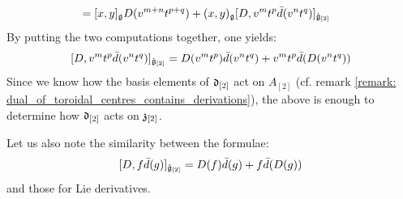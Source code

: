 \begin{remark}
\begin{enumerate}
$$\begin{aligned}
                            & = [x, y]_{\mathfrak{g}} D(v^{m + n} t^{p + q}) + (x, y)_{\mathfrak{g}} [D, v^m t^p \bar{d}(v^n t^q)]_{\hat{\mathfrak{g}}_{[2]}}
                        \end{aligned}
                    $$
                By putting the two computations together, one yields:
                    $$[D, v^m t^p \bar{d}(v^n t^q)]_{\hat{\mathfrak{g}}_{[2]}} = D(v^m t^p) \bar{d}(v^n t^q) + v^m t^p \bar{d}(D(v^n t^q))$$
                Since we know how the basis elements of $\mathfrak{d}_{[2]}$ act on $A_{[2]}$ (cf. remark \ref{remark: dual_of_toroidal_centres_contains_derivations}), the above is enough to determine how $\mathfrak{d}_{[2]}$ acts on $\mathfrak{z}_{[2]}$. 

                Let us also note the similarity between the formulae:
                    $$[D, f \bar{d}(g)]_{\hat{\mathfrak{g}}_{[2]}} = D(f) \bar{d}(g) + f \bar{d}(D(g))$$
                and those for Lie derivatives.
                

\end{enumerate}
\end{remark}
